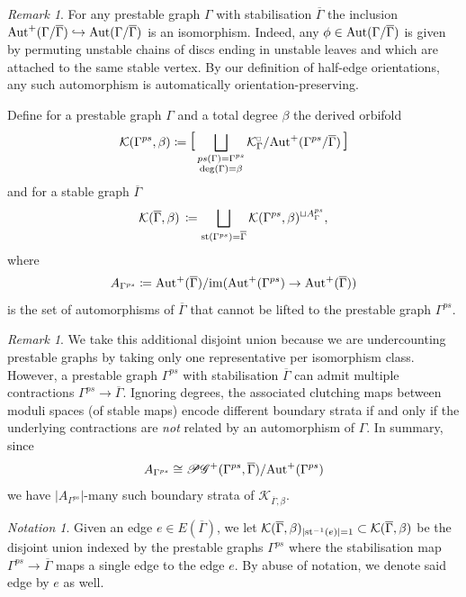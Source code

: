 \documentclass[11pt,psamsfonts, oneside, reqno]{amsart}
\newcommand{\hkra}{\hookrightarrow}
\newcommand{\sub}{\subset}%
\newcommand{\inv}{^{-1}}
\newcommand{\djun}[1]{\bigsqcup\limits_{#1}}
\newcommand{\scG}{\mathscr{G}}
\newcommand{\scP}{\mathscr{P}}
\newcommand{\im}{\normalfont\text{im}}
\newcommand{\Aut}{\normalfont\text{Aut}}
\newcommand{\cK}{\mathcal{K}}
\newcommand{\stb}{\normalfont\text{st}}
\newcommand{\ov}[1]{\overline{#1}}
\newcommand{\cKc}{\cK^{\scale{\square}{0.6}}}
\newcommand{\scale}[2]{\scaleobj{#2}{#1}}
\theoremstyle{definition}
\theoremstyle{remark}
\newtheorem{remark}[theorem]{Remark}
\newtheorem{nota}[theorem]{Notation}
\numberwithin{equation}{section}
\begin{document}
\begin{remark}\label{rem:permuting-disc-bubbles} For any prestable graph $\Gamma$ with stabilisation $\ov\Gamma$ the inclusion $\Aut^+(\Gamma/\ov\Gamma)\hkra \Aut(\Gamma/\ov\Gamma)$ is an isomorphism. Indeed, any $\phi\in \Aut(\Gamma/\ov\Gamma)$ is given by permuting unstable chains of discs ending in unstable leaves and which are attached to the same stable vertex. By our definition of half-edge orientations, any such automorphism is automatically orientation-preserving.
\end{remark}

Define for a prestable graph $\Gamma$ and a total degree $\beta$ the derived orbifold
\begin{equation}\label{} \cK(\Gamma^{ps},\beta) \coloneqq \scalebox{1.5}{[}\djun{\substack{ps(\Gamma) = \Gamma^{ps}\\\deg(\Gamma) = \beta}}\cKc_\Gamma/\Aut^+(\Gamma^{ps}/\ov\Gamma)\,\scalebox{1.5}{]}
\end{equation}
and for a stable graph $\ov\Gamma$ 
\begin{equation}\label{eq:gkc-of-stable-graph}
	\cK(\ov\Gamma,\beta) \,\coloneqq \djun{\stb(\Gamma^{ps}) = \ov\Gamma}\cK(\Gamma^{ps},\beta)^{\sqcup A^{ps}_\Gamma},
\end{equation}
where 
\begin{equation}\label{eq:non-liftable-automorphisms}
	A_{\Gamma^{ps}}\coloneqq \Aut^+(\ov\Gamma)/\im(\Aut^+(\Gamma^{ps})\to \Aut^+(\ov\Gamma)) 
\end{equation} 
is the set of automorphisms of $\ov\Gamma$ that cannot be lifted to the prestable graph $\Gamma^{ps}$. 

\begin{remark}\label{rem:additional-exponent} 
	We take this additional disjoint union because we are undercounting prestable graphs by taking only one representative per isomorphism class. However, a prestable graph $\Gamma^{ps}$ with stabilisation $\ov\Gamma$ can admit multiple contractions $\Gamma^{ps}\to \ov\Gamma$. Ignoring degrees, the associated clutching maps between moduli spaces (of stable maps) encode different boundary strata if and only if the underlying contractions are \emph{not} related by an automorphism of $\Gamma$. In summary, since 
	$$A_{\Gamma^{ps}} \cong \scP\scG^+(\Gamma^{ps},\ov\Gamma)/\Aut^+(\Gamma^{ps})$$
	we have $|A_{\Gamma^{ps}}|$-many such boundary strata of $\cK_{\ov\Gamma,\beta}$.
\end{remark}

\begin{nota}
	Given an edge $e\in E(\ov\Gamma)$, we let $\cK(\ov\Gamma,\beta)_{|\stb\inv(e)|=1} \sub 	\cK(\ov\Gamma,\beta)$ be the disjoint union indexed by the prestable graphs $\Gamma^{ps}$ where the stabilisation map $\Gamma^{ps}\to \ov\Gamma$ maps a single edge to the edge $e$. By abuse of notation, we denote said edge by $e$ as well.
\end{nota}
\end{document}
